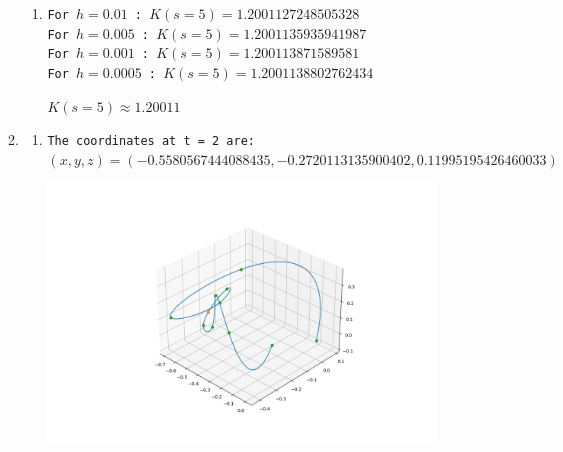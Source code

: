 \documentclass[a4paper,11pt]{article}
\begin{document}
\begin{preview}
\begin{enumerate}
\begin{enumerate}
\begin{enumerate}
    \item 
    \texttt{For $h = 0.01$ : $K(s=5) = 1.2001127248505328$\\
            For $h = 0.005$ : $K(s=5) = 1.2001135935941987$\\
            For $h = 0.001$ : $K(s=5) = 1.200113871589581$\\
            For $h = 0.0005$ : $K(s=5) = 1.2001138802762434$\\}

    $K(s=5) \approx 1.20011 $\\
    

\end{enumerate}

\item 
\begin{enumerate}
    \item \texttt{The coordinates at t = 2 are: \\$(x,y,z) = (-0.5580567444088435,-0.2720113135900402,0.11995195426460033)$}
    \begin{center}
        \hspace{-50pt}
        \includegraphics[width = 0.9\textwidth]{Figure_2.png}
    \end{center}


\end{enumerate}
\end{enumerate}
\end{enumerate}
\end{preview}
\end{document}
